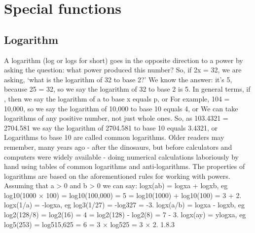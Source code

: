 \section{Special functions}
\subsection{Logarithm}
A logarithm (log or logs for short) goes in the opposite direction to a power by asking the question: what power produced this number? So, if 2x = 32, we are asking, ‘what is the logarithm of 32 to base 2?’ We know the answer: it's 5, because 25 = 32, so we say the logarithm of 32 to base 2 is 5. In general terms, if , then we say the logarithm of a to base x equals p, or For example, 104 = 10,000, so we say the logarithm of 10,000 to base 10 equals 4, or We can take logarithms of any positive number, not just whole ones. So, as 103.4321 = 2704.581 we say the logarithm of 2704.581 to base 10 equals 3.4321, or Logarithms to base 10 are called common logarithms. Older readers may remember, many years ago - after the dinosaurs, but before calculators and computers were widely available - doing numerical calculations laboriously by hand using tables of common logarithms and anti-logarithms. The properties of logarithms are based on the aforementioned rules for working with powers. Assuming that a > 0 and b > 0 we can say: logx(ab) = logxa + logxb, eg log10(1000 × 100) = log10(100,000) = 5 = log10(1000) + log10(100) = 3 + 2. logx(1/a) = -logxa, eg log3(1/27) = -log327 = -3. logx(a/b) = logxa - logxb, eg log2(128/8) = log2(16) = 4 = log2(128) - log2(8) = 7 - 3. logx(ay) = ylogxa, eg log5(253) = log515,625 = 6 = 3 × log525 = 3 × 2. 1.8.3


